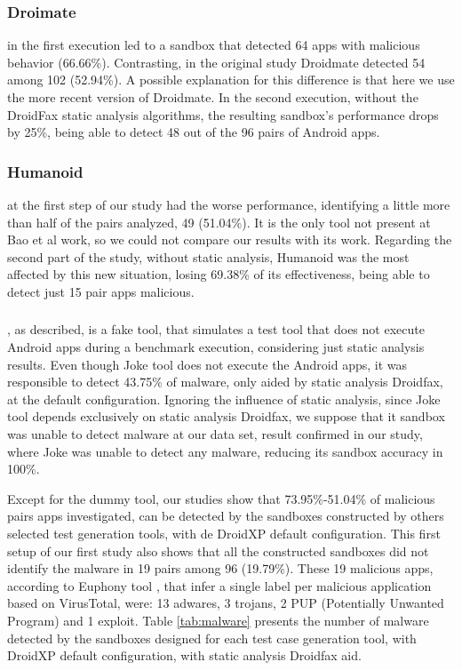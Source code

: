 \subsubsection*{Droimate} in the first execution led to a sandbox that detected 64 apps with malicious behavior (66.66\%). Contrasting, in the original study Droidmate detected 54 among 102 (52.94\%). A possible explanation for this difference is that here we use the more recent version of Droidmate. In the second execution, without the DroidFax static analysis algorithms, the resulting sandbox's performance drops by 25\%, being able to detect 48 out of the 96 pairs of Android apps. 



\subsubsection*{Humanoid} at the first step of our study had the worse performance, identifying a little more than half of the pairs analyzed, 49 (51.04\%). It is the only tool not present at Bao et al work, so we could not compare our results with its work. Regarding the second part of the study, without static analysis, Humanoid was the most affected by this new situation, losing 69.38\% of its effectiveness, being able to detect just 15 pair apps malicious.

\subsubsection*{\joke}, as described, is a fake tool, that simulates a test tool that does not execute Android apps during a benchmark execution, considering just static analysis results. Even though Joke tool does not execute the Android apps, it was responsible to detect 43.75\% of malware, only aided by static analysis Droidfax, at the default configuration. Ignoring the influence of static analysis, since Joke tool depends exclusively on static analysis Droidfax, we suppose that it sandbox was unable to detect malware at our data set, result confirmed in our study, where Joke was unable to detect any malware, reducing its sandbox accuracy in 100\%.

Except for the \joke dummy tool, our studies show that 73.95\%-51.04\% of malicious pairs apps investigated, can be detected by the sandboxes constructed by others selected test generation tools, with de DroidXP default configuration. This first setup of our first study also shows that all the constructed sandboxes did not identify the malware in 19 pairs among 96 (19.79\%). These 19 malicious apps, according to Euphony tool \cite{hurier2017euphony}, that infer a single label per malicious application based on VirusTotal, were: 13 adwares, 3 trojans, 2 PUP (Potentially Unwanted Program) and 1 exploit. Table \ref{tab:malware} presents the number of malware detected by the sandboxes designed for each test case generation tool, with DroidXP default configuration, with static analysis Droidfax aid.

